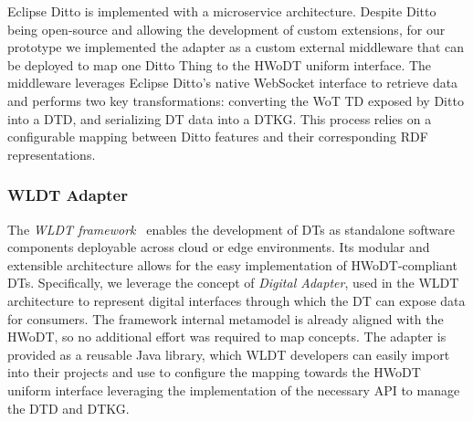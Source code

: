 Eclipse Ditto is implemented with a microservice architecture. 
Despite Ditto being open-source and allowing the development of custom extensions, for our prototype we implemented the adapter as a custom external middleware that can be deployed to map one Ditto Thing to the \ac{HWoDT} uniform interface.
%
The middleware leverages Eclipse Ditto’s native WebSocket interface to retrieve data and performs two key transformations: converting the \ac{WoT} \ac{TD} exposed by Ditto into a \ac{DTD}, and serializing \ac{DT} data into a \ac{DTKG}.
This process relies on a configurable mapping between Ditto features and their corresponding \ac{RDF} representations.


\subsubsection{\acl{WLDT} Adapter}

The \emph{\acf{WLDT} framework}~\cite{picone2021wldt} enables the development of \acp{DT} as standalone software components deployable across cloud or edge environments.
Its modular and extensible architecture allows for the easy implementation of \ac{HWoDT}-compliant \acp{DT}.
Specifically, we leverage the concept of \emph{Digital Adapter}, used in the \ac{WLDT} architecture to represent digital interfaces through which the \ac{DT} can expose data for consumers.
%
The framework internal metamodel is already aligned with the \ac{HWoDT}, so no additional effort was required to map concepts.
The adapter is provided as a reusable Java library, which \ac{WLDT} developers can easily import into their projects and use to configure the mapping towards the \ac{HWoDT} uniform interface leveraging the implementation of the necessary \ac{API} to manage the \ac{DTD} and \ac{DTKG}.

